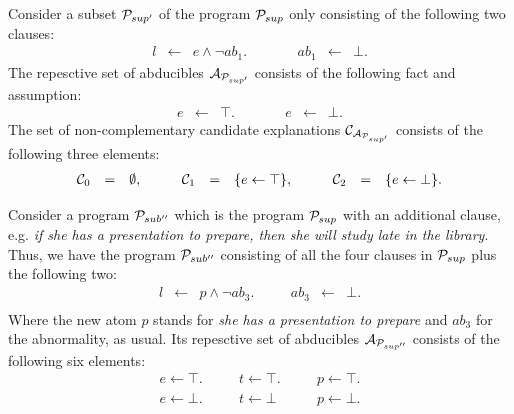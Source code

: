\vspace*{\fill}
\begin{tcolorbox}
\begin{example}
\label{example:suppressionvariation}
\normalfont 
Consider a subset $\mathcal{P}_{sup'}$ of the program $\mathcal{P}_{sup}$ only consisting of the following two clauses:
\[
\begin{array}{lclclcl}
l &\leftarrow& e \wedge \neg ab_1. &\quad\quad& ab_1 &\leftarrow& \bot.
\end{array}
\]
The repesctive set of abducibles $\mathcal{A}_{\mathcal{P}_{sup'}}$ consists of the following fact and assumption:
\[
\begin{array}{lclclcl}
e &\leftarrow& \top. &\quad\quad& e &\leftarrow& \bot.
\end{array}
\]
The set of non-complementary candidate explanations $\mathcal{C}_{\mathcal{A}_{\mathcal{P}_{sup'}}}$ consists of the following three elements:
\[
\begin{array}{lclclclclcl}
\mathcal{C}_0 &=& \emptyset, &\quad& \mathcal{C}_1 &=& \{e \leftarrow \top\}, &\quad& \mathcal{C}_2 &=& \{e \leftarrow \bot\}.
\end{array}
\]

Consider a program $\mathcal{P}_{sub''}$ which is the program $\mathcal{P}_{sup}$ with an additional clause, e.g. \textit{if she has a presentation to prepare, then she will study late in the library}. Thus, we have the program $\mathcal{P}_{sub''}$ consisting of all the four clauses in $\mathcal{P}_{sup}$ plus the following two:
\[
\begin{array}{lclclcl}
l &\leftarrow& p \wedge \neg ab_3. &\quad& ab_3 &\leftarrow& \bot.\\
\end{array}
\]
Where the new atom $p$ stands for \textit{she has a presentation to prepare} and $ab_3$ for the abnormality, as usual. Its repesctive set of abducibles $\mathcal{A}_{\mathcal{P}_{sup''}}$ consists of the following six elements:
\[
\begin{array}{ccccc}
e \leftarrow \top. & \quad & t \leftarrow \top. & \quad & p \leftarrow \top. \\
e \leftarrow \bot. & \quad & t \leftarrow \bot  & \quad & p \leftarrow \bot.
\end{array}
\]


\end{example}
\end{tcolorbox}
